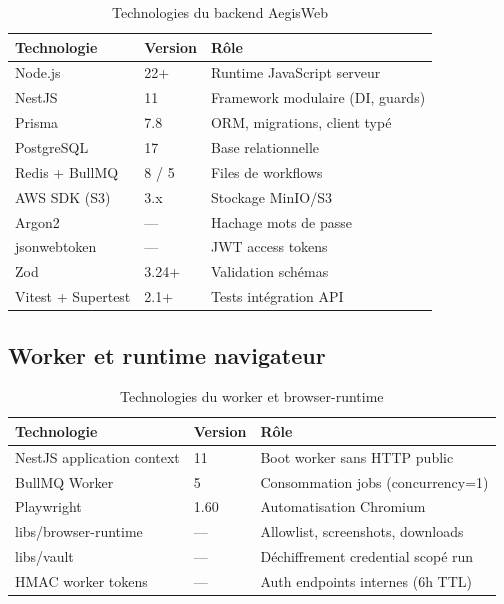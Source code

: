 \begin{table}[H]
\centering
\caption{Technologies du backend AegisWeb}
\label{tab:tech_backend}
\begin{tabularx}{\textwidth}{@{}p{3.6cm}p{2.4cm}X@{}}
\toprule
\textbf{Technologie}      & \textbf{Version} & \textbf{Rôle} \\
\midrule
\rowcolor{rowgray}
Node.js                   & 22+              & Runtime JavaScript serveur \\
NestJS                    & 11               & Framework modulaire (DI, guards) \\
\rowcolor{rowgray}
Prisma                    & 7.8              & ORM, migrations, client typé \\
PostgreSQL                & 17               & Base relationnelle \\
\rowcolor{rowgray}
Redis + BullMQ            & 8 / 5            & Files de workflows \\
AWS SDK (S3)              & 3.x              & Stockage MinIO/S3 \\
\rowcolor{rowgray}
Argon2                    & —                & Hachage mots de passe \\
jsonwebtoken              & —                & JWT access tokens \\
\rowcolor{rowgray}
Zod                       & 3.24+            & Validation schémas \\
Vitest + Supertest        & 2.1+             & Tests intégration API \\
\bottomrule
\end{tabularx}
\end{table}

\subsection{Worker et runtime navigateur}

\begin{table}[H]
\centering
\caption{Technologies du worker et browser-runtime}
\label{tab:tech_worker}
\begin{tabularx}{\textwidth}{@{}p{3.6cm}p{2.4cm}X@{}}
\toprule
\textbf{Technologie}      & \textbf{Version}  & \textbf{Rôle} \\
\midrule
\rowcolor{rowgray}
NestJS application context & 11               & Boot worker sans HTTP public \\
BullMQ Worker             & 5                 & Consommation jobs (concurrency=1) \\
\rowcolor{rowgray}
Playwright                & 1.60              & Automatisation Chromium \\
libs/browser-runtime      & —                 & Allowlist, screenshots, downloads \\
\rowcolor{rowgray}
libs/vault                & —                 & Déchiffrement credential scopé run \\
HMAC worker tokens        & —                 & Auth endpoints internes (6h TTL) \\
\bottomrule
\end{tabularx}
\end{table}

